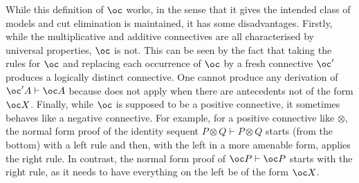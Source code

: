 While this definition of $\oc$ works, in the sense that it gives the intended
class of models and cut elimination is maintained, it has some disadvantages.
Firstly, while the multiplicative and additive connectives are all characterised
by universal properties, $\oc$ is not.
This can be seen by the fact that taking the rules for $\oc$ and replacing each
occurrence of $\oc$ by a fresh connective $\oc'$ produces a logically distinct
connective.
One cannot produce any derivation of $\oc' A \vdash \oc A$ because
 does not apply when there are antecedents not of the form
$\oc X$.
Finally, while $\oc$ is supposed to be a positive connective, it sometimes
behaves like a negative connective.
For example, for a positive connective like $\otimes$, the normal form proof
of the identity sequent $P \otimes Q \vdash P \otimes Q$ starts (from the
bottom) with a left rule and then, with the left in a more amenable form,
applies the right rule.
In contrast, the normal form proof of $\oc P \vdash \oc P$ starts with the
right rule, as it needs to have everything on the left be of the form $\oc X$.

